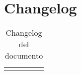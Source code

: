 \newpage

\section{Changelog}

\begin{center}
\begin{longtable}{|c|c|c|c|c|}
\hline

\caption{Changelog del documento}
\end{longtable}
\end{center}
